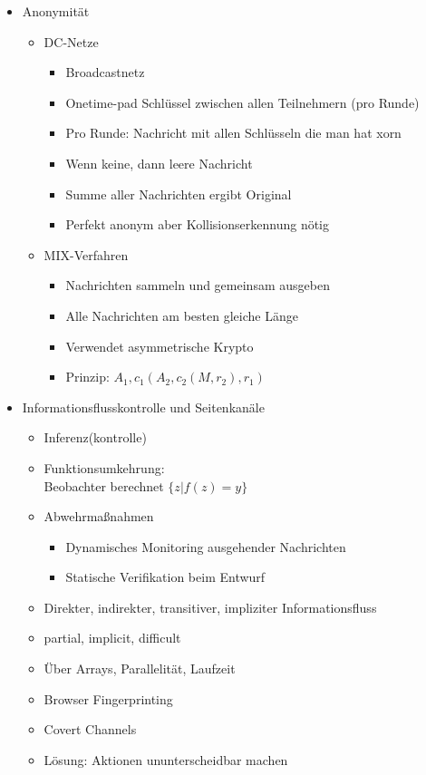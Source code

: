 \documentclass[11pt, paper=a4, twocolumn]{scrartcl}
\begin{document}
\begin{itemize}
		\item Anonymität
			\begin{itemize}
				\item DC-Netze
					\begin{itemize}
						\item Broadcastnetz
						\item Onetime-pad Schlüssel zwischen allen 
							Teilnehmern (pro Runde)
						\item Pro Runde: Nachricht mit allen 
							Schlüsseln die man hat xorn
						\item Wenn keine, dann leere Nachricht
						\item Summe aller Nachrichten ergibt 
							Original
						\item Perfekt anonym aber 
							Kollisionserkennung nötig
					\end{itemize}

				\item MIX-Verfahren
					\begin{itemize}
						\item Nachrichten sammeln und gemeinsam 
							ausgeben
						\item Alle Nachrichten am besten gleiche 
							Länge
						\item Verwendet asymmetrische Krypto
						\item Prinzip: 
							$A_1,c_1(A_2,c_2(M,r_2),r_1)$
					\end{itemize}

			\end{itemize}

		\item Informationsflusskontrolle und Seitenkanäle
			\begin{itemize}
				\item Inferenz(kontrolle)
				\item Funktionsumkehrung: \\
					Beobachter berechnet $\{z | f(z) = y\}$
				\item Abwehrmaßnahmen
					\begin{itemize}
						\item Dynamisches Monitoring ausgehender 
							Nachrichten
						\item Statische Verifikation beim Entwurf
					\end{itemize}
				\item Direkter, indirekter, transitiver, impliziter 
					Informationsfluss
				\item partial, implicit, difficult
				\item Über Arrays, Parallelität, Laufzeit
				\item Browser Fingerprinting
				\item Covert Channels
				\item Lösung: Aktionen ununterscheidbar machen
			\end{itemize}
	\end{itemize}
\end{document}
